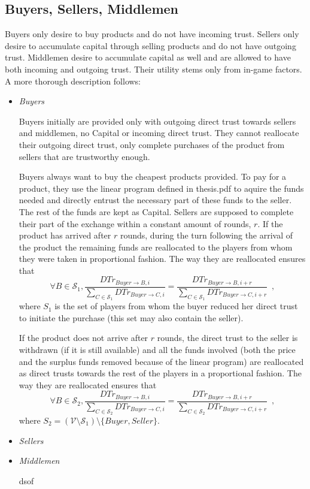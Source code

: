\subsection{Buyers, Sellers, Middlemen}
  Buyers only desire to buy products and do not have incoming trust. Sellers only desire to accumulate capital through selling
  products and do not have outgoing trust. Middlemen desire to accumulate capital as well and are allowed to have both
  incoming and outgoing trust. Their utility stems only from in-game factors. A more thorough description follows:

  \begin{itemize}
    \item \textit{Buyers}

    Buyers initially are provided only with outgoing direct trust towards sellers and middlemen, no Capital or incoming direct
    trust. They cannot reallocate their outgoing direct trust, only complete purchases of the product from sellers that are
    trustworthy enough.
    
    Buyers always want to buy the cheapest products provided. To pay for a product, they use the linear program defined in
    thesis.pdf to aquire the funds needed and directly entrust the necessary part of these funds to the seller. The rest of
    the funds are kept as Capital. Sellers are supposed to complete their part of the exchange within a constant amount of
    rounds, $r$. If the product has arrived after $r$ rounds, during the turn following the arrival of the product the
    remaining funds are reallocated to the players from whom they were taken in proportional fashion. The way they are
    reallocated ensures that
    \begin{equation*}
      \forall B \in \mathcal{S}_1, \frac{DTr_{Buyer \rightarrow B, i}}{\sum\limits_{C \in \mathcal{S}_1}DTr_{Buyer \rightarrow
      C, i}} = \frac{DTr_{Buyer \rightarrow B, i + r}}{\sum\limits_{C \in \mathcal{S}_1}DTr_{Buyer \rightarrow C, i + r}}
      \enspace,
    \end{equation*}
    where $S_1$ is the set of players from whom the buyer reduced her direct trust to initiate the purchase (this set may also
    contain the seller).

    If the product does not arrive after $r$ rounds, the direct trust to the seller is withdrawn (if it is still available)
    and all the funds involved (both the price and the surplus funds removed because of the linear program) are reallocated as
    direct trusts towards the rest of the players in a proportional fashion. The way they are reallocated ensures that
    \begin{equation*}
      \forall B \in \mathcal{S}_2, \frac{DTr_{Buyer \rightarrow B, i}}{\sum\limits_{C \in \mathcal{S}_2}DTr_{Buyer \rightarrow
      C, i}} = \frac{DTr_{Buyer \rightarrow B, i + r}}{\sum\limits_{C \in \mathcal{S}_2}DTr_{Buyer \rightarrow C, i + r}}
      \enspace,
    \end{equation*}
    where $S_2 = \left(\mathcal{V} \setminus \mathcal{S}_1\right) \setminus{\{Buyer, Seller\}}$.
    \item \textit{Sellers}

    \item \textit{Middlemen}

    dsof
  \end{itemize}
